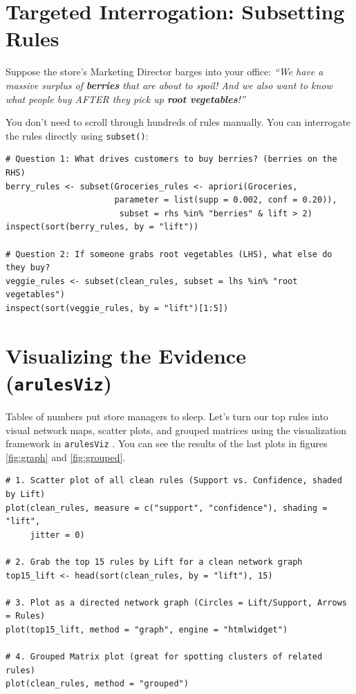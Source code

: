 \documentclass[11pt]{article}
\begin{document}
\section{Targeted Interrogation: Subsetting Rules}

Suppose the store's Marketing Director barges into your office: \textit{``We have a massive surplus of \textbf{berries} that are about to spoil! And we also want to know what people buy AFTER they pick up \textbf{root vegetables}!''}

You don't need to scroll through hundreds of rules manually. You can interrogate the rules directly using \texttt{subset()}:

\begin{lstlisting}[caption={Targeting specific items on the LHS or RHS.}]
# Question 1: What drives customers to buy berries? (berries on the RHS)
berry_rules <- subset(Groceries_rules <- apriori(Groceries, 
                      parameter = list(supp = 0.002, conf = 0.20)), 
                       subset = rhs %in% "berries" & lift > 2)
inspect(sort(berry_rules, by = "lift"))

# Question 2: If someone grabs root vegetables (LHS), what else do they buy?
veggie_rules <- subset(clean_rules, subset = lhs %in% "root vegetables")
inspect(sort(veggie_rules, by = "lift")[1:5])
\end{lstlisting}

\section{Visualizing the Evidence (\texttt{arulesViz})}

Tables of numbers put store managers to sleep. Let's turn our top rules into visual network maps, scatter plots, and grouped matrices using the visualization framework in \texttt{arulesViz} \cite{hahsler2017arulesviz}.  You can see the results of the last plots in figures \ref{fig:graph} and \ref{fig:grouped}.

\begin{lstlisting}[caption={Visualizing rules with scatter plots, network graphs, and grouped matrices.}]
# 1. Scatter plot of all clean rules (Support vs. Confidence, shaded by Lift)
plot(clean_rules, measure = c("support", "confidence"), shading = "lift", 
     jitter = 0)

# 2. Grab the top 15 rules by Lift for a clean network graph
top15_lift <- head(sort(clean_rules, by = "lift"), 15)

# 3. Plot as a directed network graph (Circles = Lift/Support, Arrows = Rules)
plot(top15_lift, method = "graph", engine = "htmlwidget")

# 4. Grouped Matrix plot (great for spotting clusters of related rules)
plot(clean_rules, method = "grouped")
\end{lstlisting}
\end{document}
